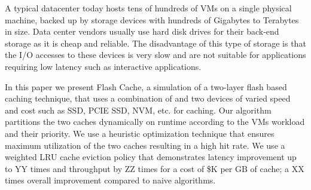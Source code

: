 A typical datacenter today hosts tens of hundreds of VMs on a single physical machine, backed up by storage devices with hundreds of Gigabytes to Terabytes in size. Data center vendors usually use hard disk drives for their back-end storage as it is cheap and reliable. The disadvantage of this type of storage is that the I/O accesses to these devices is very slow and are not suitable for applications requiring low latency such as interactive applications.

In this paper we present Flash Cache, a simulation of a two-layer flash based caching technique, that uses a combination of and two devices of varied speed and cost such as SSD, PCIE SSD, NVM, etc. for caching. Our algorithm partitions the two caches dynamically on runtime according to the VMs workload and their priority. We use a heuristic optimization technique that ensures maximum utilization of the two caches resulting in a high hit rate. We use a weighted LRU cache eviction policy that demonstrates latency improvement up to YY times and throughput by ZZ times for a cost of \$K per GB of cache; a XX times overall improvement compared to naive algorithms.
